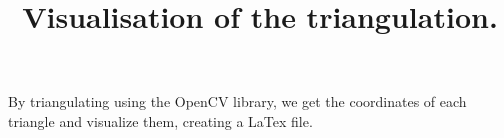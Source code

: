\documentclass[a4paper]{article}
\title{Visualisation of the triangulation.}
\begin{document}
\maketitle
{}
\item By triangulating using the OpenCV library, we get the coordinates of each triangle and visualize them, creating a LaTex file.
\end{document}
